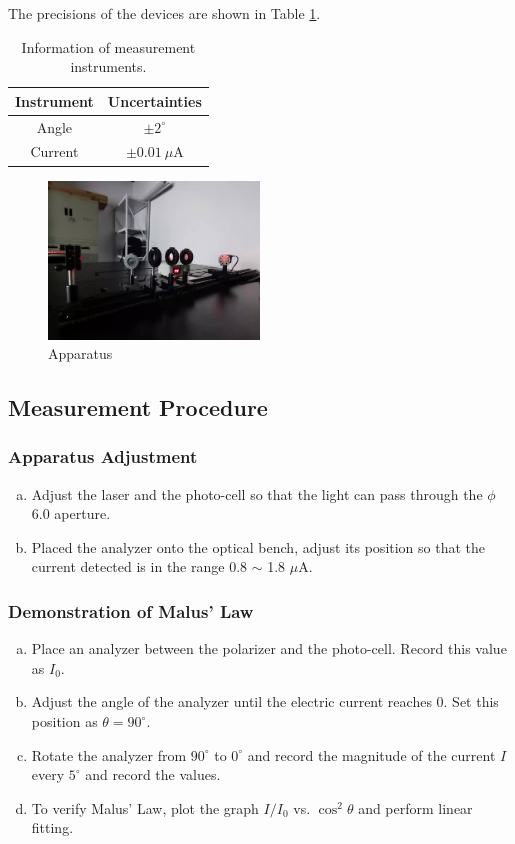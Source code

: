 \documentclass[a4paper]{article}
\begin{document}
The precisions of the devices are shown in Table \ref{table::Precision}.
\begin{table}[htbp]
	\centering
	\begin{tabular}{cc}
		\hline
		Instrument & Uncertainties    \\
		\hline
		Angle      & $\pm 2^\circ$    \\
		Current    & $\pm 0.01\ \mu$A \\
		\hline
	\end{tabular}
	\caption{Information of measurement instruments.}
	\label{table::Precision}
\end{table}

\begin{figure}[!htbp]
	\centering
	\includegraphics[width=0.5\textwidth]{apparatus.jpg}
	\caption{Apparatus}
\end{figure}

\subsection{Measurement Procedure}

\subsubsection{Apparatus Adjustment}
\begin{enumerate}[a.]
	\item Adjust the laser and the photo-cell so that the light can pass through the $\phi$ 6.0 aperture.
	\item Placed the analyzer onto the optical bench, adjust its position so that the current detected is in the range 0.8 $\sim$ 1.8 $\mu$A.
\end{enumerate}

\subsubsection{Demonstration of Malus' Law}
\begin{enumerate}[a.]
	\item Place an analyzer between the polarizer and the photo-cell. Record this value as $I_0$.
	\item Adjust the angle of the analyzer until the electric current reaches 0. Set this position as $\theta = 90^\circ$.
	\item Rotate the analyzer from $90^\circ$ to $0^\circ$ and record the magnitude of the current $I$ every $5^\circ$ and record the values.
	\item To verify Malus' Law, plot the graph $I/I_0$ vs. $\cos^2\theta$ and perform linear fitting.
\end{enumerate}
\end{document}
